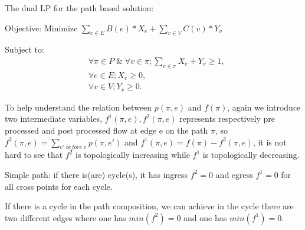 \documentclass[twoside,leqno, 11pt]{article}
\begin{document}



The dual LP for the path based solution:

Objective: Minimize $\sum \limits_{e \in E} B(e)* X_e +\sum \limits_{v \in V} C(v)*Y_v $

Subject to:
\begin{subequations}
\begin{align}
&\forall \pi \in P \; \&\; \forall v \in \pi; \sum \limits_{e\in \pi} X_e + Y_v \geq 1,\\
&\forall e \in E; X_e\geq 0,\\
&\forall v \in V; Y_v\geq 0.
\end{align}
\end{subequations}

To help understand the relation between $p(\pi, e)$ and $f(\pi)$, again we introduce two intermediate variables, $f^1(\pi, e), f^2(\pi, e) $ represents respectively pre processed and post processed flow at edge e on the path $\pi$, so $f^2(\pi, e) =\sum\limits_{e'\; before\;e}p(\pi, e') $ and $ f^1(\pi, e)=f(\pi)- f^2(\pi, e)$, it is not hard to see that $f^2$ is topologically increasing while $f^1$ is topologically decreasing.



\begin{Definition}
Simple path: if there is(are) cycle(s), it has ingress $f^2 = 0$ and egress $f^1=0$ for all cross points for each cycle. 
\end{Definition}

\begin{lemma} If there is a cycle in the path composition, we can achieve in the cycle there are two different edges where one has $min(f^2) = 0$ and one has $min(f^1)=0$. 
\end{lemma}
\end{document}

